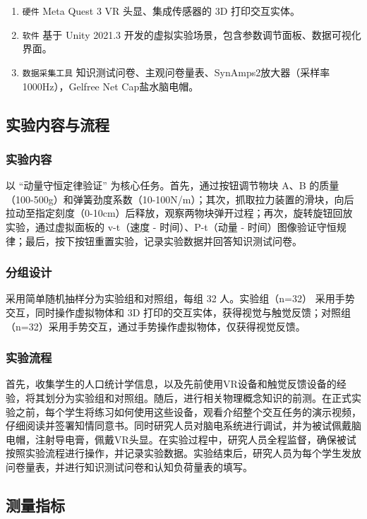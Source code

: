 \documentclass[runningheads]{llncs}
\begin{document}
\begin{enumerate}[label={$\bullet$}]
  \item \texttt{硬件} Meta Quest 3 VR 头显、集成传感器的 3D 打印交互实体。
  \item \texttt{软件} 基于 Unity 2021.3 开发的虚拟实验场景，包含参数调节面板、数据可视化界面。
  \item \texttt{数据采集工具} 知识测试问卷、主观问卷量表、SynAmps2放大器（采样率1000Hz），Gelfree Net Cap盐水脑电帽。
\end{enumerate}

\subsection{实验内容与流程}
\subsubsection{实验内容}
以 “动量守恒定律验证” 为核心任务。首先，通过按钮调节物块 A、B 的质量（100-500g）和弹簧劲度系数（10-100N/m）；其次，抓取拉力装置的滑块，向后拉动至指定刻度（0-10cm）后释放，观察两物块弹开过程；再次，旋转旋钮回放实验，通过虚拟面板的 v-t（速度 - 时间）、P-t（动量 - 时间）图像验证守恒规律；最后，按下按钮重置实验，记录实验数据并回答知识测试问卷。

\subsubsection{分组设计} 采用简单随机抽样分为实验组和对照组，每组 32 人。实验组（n=32） 采用手势交互，同时操作虚拟物体和 3D 打印的交互实体，获得视觉与触觉反馈；对照组（n=32）采用手势交互，通过手势操作虚拟物体，仅获得视觉反馈。

\subsubsection{实验流程}
首先，收集学生的人口统计学信息，以及先前使用VR设备和触觉反馈设备的经验，将其划分为实验组和对照组。随后，进行相关物理概念知识的前测。在正式实验之前，每个学生将练习如何使用这些设备，观看介绍整个交互任务的演示视频，仔细阅读并签署知情同意书。同时研究人员对脑电系统进行调试，并为被试佩戴脑电帽，注射导电膏，佩戴VR头显。在实验过程中，研究人员全程监督，确保被试按照实验流程进行操作，并记录实验数据。实验结束后，研究人员为每个学生发放问卷量表，并进行知识测试问卷和认知负荷量表的填写。

\subsection{测量指标}
\end{document}
